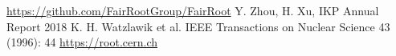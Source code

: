 \documentclass[fleqn,twocolumn,a4paper]{ikpar}
\begin{document}
\par
\medskip

\begin{thebibliography}{99}
 \url{https://github.com/FairRootGroup/FairRoot}
 Y. Zhou, H. Xu, IKP Annual Report 2018
 K. H. Watzlawik et al. IEEE Transactions on Nuclear Science 43 (1996): 44
 \url{https://root.cern.ch}
\end{thebibliography}
\end{document}
